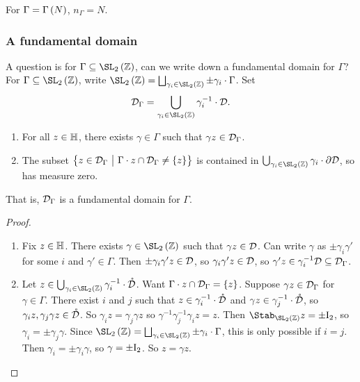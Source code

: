 \begin{example*}
For $ \Gamma = \Gamma\br{N} $, $ n_\Gamma = N $.
\end{example*}

\pagebreak

\subsubsection{A fundamental domain}

A question is for $ \Gamma \subseteq \SL_2\br{\ZZ} $, can we write down a fundamental domain for $ \Gamma $? For $ \Gamma \subseteq \SL_2\br{\ZZ} $, write $ \SL_2\br{\ZZ} = \bigsqcup_{\gamma_i \in \SL_2\br{\ZZ}} \pm\gamma_i \cdot \Gamma $. Set
$$ \DDD_\Gamma = \bigcup_{\gamma_i \in \SL_2\br{\ZZ}} \gamma_i^{-1} \cdot \DDD. $$

\begin{theorem}
\hfill
\begin{enumerate}
\item For all $ z \in \mathbb{H} $, there exists $ \gamma \in \Gamma $ such that $ \gamma z \in \mathcal{D}_\Gamma $.
\item The subset $ \cbr{z \in \DDD_\Gamma \st \Gamma \cdot z \cap \DDD_\Gamma \ne \cbr{z}} $ is contained in $ \bigcup_{\gamma_i \in \SL_2\br{\ZZ}} \gamma_i \cdot \partial\DDD $, so has measure zero.
\end{enumerate}
That is, $ \mathcal{D}_\Gamma $ is a fundamental domain for $ \Gamma $.
\end{theorem}

\begin{proof}
\hfill
\begin{enumerate}
\item Fix $ z \in \mathbb{H} $. There exists $ \gamma \in \SL_2\br{\ZZ} $ such that $ \gamma z \in \mathcal{D} $. Can write $ \gamma $ as $ \pm\gamma_i\gamma' $ for some $ i $ and $ \gamma' \in \Gamma $. Then $ \pm\gamma_i\gamma'z \in \mathcal{D} $, so $ \gamma_i\gamma'z \in \mathcal{D} $, so $ \gamma'z \in \gamma_i^{-1}\mathcal{D} \subseteq \mathcal{D}_\Gamma $.
\item Let $ z \in \bigcup_{\gamma_i \in \SL_2\br{\ZZ}} \gamma_i^{-1} \cdot \mathring{\DDD} $. Want $ \Gamma \cdot z \cap \DDD_\Gamma = \cbr{z} $. Suppose $ \gamma z \in \mathcal{D}_\Gamma $ for $ \gamma \in \Gamma $. There exist $ i $ and $ j $ such that $ z \in \gamma_i^{-1} \cdot \mathring{\mathcal{D}} $ and $ \gamma z \in \gamma_j^{-1} \cdot \mathring{\mathcal{D}} $, so $ \gamma_iz, \gamma_j\gamma z \in \mathring{\mathcal{D}} $. So $ \gamma_iz = \gamma_j\gamma z $ so $ \gamma^{-1}\gamma_j^{-1}\gamma_iz = z $. Then $ \Stab_{\SL_2\br{\ZZ}} z = \pm\I_2 $, so $ \gamma_i = \pm\gamma_j\gamma $. Since $ \SL_2\br{\ZZ} = \bigsqcup_{\gamma_i \in \SL_2\br{\ZZ}} \pm\gamma_i \cdot \Gamma $, this is only possible if $ i = j $. Then $ \gamma_i = \pm\gamma_i\gamma $, so $ \gamma = \pm\mathrm{I}_2 $. So $ z = \gamma z $.
\end{enumerate}
\end{proof}

